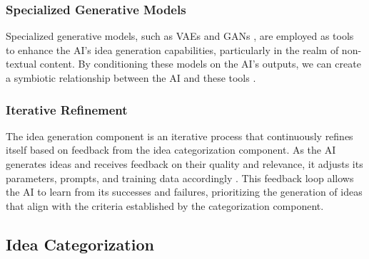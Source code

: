 \documentclass[conference]{article}
\begin{document}
	\subsubsection{Specialized Generative Models}
	Specialized generative models, such as VAEs \cite{kingma2013auto} and GANs \cite{goodfellow2014generative}, are employed as tools to enhance the AI's idea generation capabilities, particularly in the realm of non-textual content. By conditioning these models on the AI's outputs, we can create a symbiotic relationship between the AI and these tools \cite{ramesh2021zero}.
	
	\subsubsection{Iterative Refinement}
	The idea generation component is an iterative process that continuously refines itself based on feedback from the idea categorization component. As the AI generates ideas and receives feedback on their quality and relevance, it adjusts its parameters, prompts, and training data accordingly \cite{wang2019superglue, kiela2021dynabench}. This feedback loop allows the AI to learn from its successes and failures, prioritizing the generation of ideas that align with the criteria established by the categorization component.
	
	
	
	\subsection{Idea Categorization}
	
\end{document}
